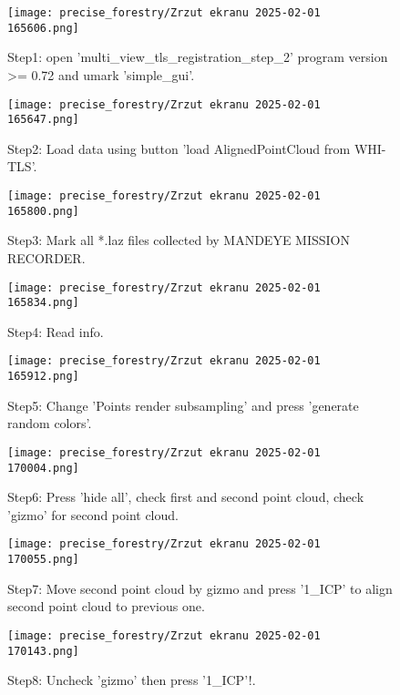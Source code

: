 \begin{figure}[H]
	\centering
	\texttt{[image: precise\_forestry/Zrzut ekranu 2025-02-01 165606.png]}
	\caption{Step1: open 'multi\_view\_tls\_registration\_step\_2' program version >= 0.72 and umark 'simple\_gui'.}
	\label{fig:pf6}
\end{figure}

\begin{figure}[H]
	\centering
	\texttt{[image: precise\_forestry/Zrzut ekranu 2025-02-01 165647.png]}
	\caption{Step2: Load data using button 'load AlignedPointCloud from WHI-TLS'.}
	\label{fig:pf7}
\end{figure}

\begin{figure}[H]
	\centering
	\texttt{[image: precise\_forestry/Zrzut ekranu 2025-02-01 165800.png]}
	\caption{Step3: Mark all *.laz files collected by MANDEYE MISSION RECORDER.}
	\label{fig:pf8}
\end{figure}

\begin{figure}[H]
	\centering
	\texttt{[image: precise\_forestry/Zrzut ekranu 2025-02-01 165834.png]}
	\caption{Step4: Read info.}
	\label{fig:pf9}
\end{figure}

\begin{figure}[H]
	\centering
	\texttt{[image: precise\_forestry/Zrzut ekranu 2025-02-01 165912.png]}
	\caption{Step5: Change 'Points render subsampling' and press 'generate random colors'.}
	\label{fig:pf10}
\end{figure}

\begin{figure}[H]
	\centering
	\texttt{[image: precise\_forestry/Zrzut ekranu 2025-02-01 170004.png]}
	\caption{Step6: Press 'hide all', check first and second point cloud, check 'gizmo' for second point cloud.}
	\label{fig:pf11}
\end{figure}

\begin{figure}[H]
	\centering
	\texttt{[image: precise\_forestry/Zrzut ekranu 2025-02-01 170055.png]}
	\caption{Step7: Move second point cloud by gizmo and press '1\_ICP' to align second point cloud to previous one.}
	\label{fig:pf12}
\end{figure}

\begin{figure}[H]
	\centering
	\texttt{[image: precise\_forestry/Zrzut ekranu 2025-02-01 170143.png]}
	\caption{Step8: Uncheck 'gizmo' then press '1\_ICP'!.}
	\label{fig:pf13}
\end{figure}

